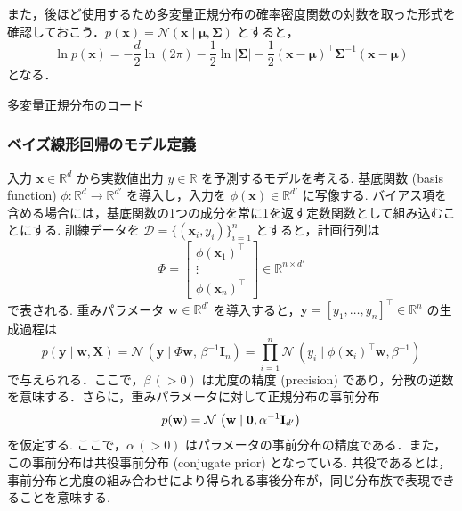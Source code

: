 \documentclass[titlepage]{ltjsbook}
\begin{document}
また，後ほど使用するため多変量正規分布の確率密度関数の対数を取った形式を確認しておこう．$p(\mathbf{x})=\mathcal{N}(\mathbf{x} \mid \boldsymbol{\mu}, \boldsymbol{\Sigma}) $ とすると，
\begin{equation}
\ln p(\mathbf{x}) = -\frac{d}{2} \ln (2\pi) - \frac{1}{2} \ln \lvert\boldsymbol{\Sigma}\rvert - \frac{1}{2}(\mathbf{x} - \boldsymbol{\mu})^\top \boldsymbol{\Sigma}^{-1} (\mathbf{x} - \boldsymbol{\mu})
\end{equation}
となる．

\begin{tcolorbox}
多変量正規分布のコード
\end{tcolorbox}

\subsubsection{ベイズ線形回帰のモデル定義}
入力 $\mathbf{x} \in \mathbb{R}^d$ から実数値出力 $y \in \mathbb{R}$ を予測するモデルを考える. 基底関数 (basis function) $\phi:\mathbb{R}^d \to \mathbb{R}^{d'}$ を導入し，入力を $\phi(\mathbf{x}) \in \mathbb{R}^{d'}$ に写像する. バイアス項を含める場合には，基底関数の1つの成分を常に1を返す定数関数として組み込むことにする. 訓練データを $\mathcal{D}=\{(\mathbf{x}_i, y_i)\}_{i=1}^n$ とすると，計画行列は
\begin{equation}
\Phi = 
\begin{bmatrix}
\phi(\mathbf{x}_1)^\top \\
\vdots \\
\phi(\mathbf{x}_n)^\top
\end{bmatrix}
\in \mathbb{R}^{n\times d'}
\end{equation}
で表される. 重みパラメータ $\mathbf{w}\in\mathbb{R}^{d'}$ を導入すると，$\mathbf{y}=[y_1,\dots,y_n]^\top \in \mathbb{R}^n$ の生成過程は
\begin{equation}
p(\mathbf{y}\mid \mathbf{w},\mathbf{X})
=\mathcal{N}\,\left(\mathbf{y}\mid \Phi \mathbf{w},\,\beta^{-1}\mathbf{I}_n\right)
= \prod_{i=1}^n \mathcal{N}\,\left(y_i\mid \phi(\mathbf{x}_i)^\top\mathbf{w} , \beta^{-1}\right)
\end{equation}
で与えられる．ここで，$\beta\,(>0)$ は尤度の精度 (precision) であり，分散の逆数を意味する．さらに，重みパラメータに対して正規分布の事前分布
\begin{equation}
p(\mathbf{w})=\mathcal{N}\,\left(\mathbf{w}\mid \mathbf{0},\alpha^{-1} \mathbf{I}_{d'}\\\right)
\end{equation}
を仮定する. ここで，$\alpha\,(>0)$ はパラメータの事前分布の精度である．また，この事前分布は共役事前分布 (conjugate prior) となっている. 共役であるとは，事前分布と尤度の組み合わせにより得られる事後分布が，同じ分布族で表現できることを意味する. 
\end{document}
